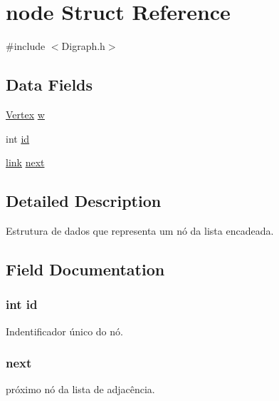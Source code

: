 \hypertarget{structnode}{}\section{node Struct Reference}
\label{structnode}


{\ttfamily \#include $<$Digraph.\+h$>$}

\subsection*{Data Fields}
\begin{DoxyCompactItemize}
\item 
\hyperlink{_digraph_8h_a053624c5d4ef5549d6a3e25bf6b27b08}{Vertex} \hyperlink{structnode_ac6c3e84cdc714053b54b0d3e63abc3b3}{w}
\item 
int \hyperlink{structnode_a7441ef0865bcb3db9b8064dd7375c1ea}{id}
\item 
\hyperlink{_digraph_8h_a80a68ca8aa709322a2736c75938d27ba}{link} \hyperlink{structnode_a5768087067b13e05f2bea8491f4313ed}{next}
\end{DoxyCompactItemize}


\subsection{Detailed Description}
Estrutura de dados que representa um nó da lista encadeada. 

\subsection{Field Documentation}
\subsubsection[{\texorpdfstring{id}{id}}]{\setlength{\rightskip}{0pt plus 5cm}int id}\hypertarget{structnode_a7441ef0865bcb3db9b8064dd7375c1ea}{}\label{structnode_a7441ef0865bcb3db9b8064dd7375c1ea}
Indentificador único do nó. 
\subsubsection[{\texorpdfstring{next}{next}}]{ next}\hypertarget{structnode_a5768087067b13e05f2bea8491f4313ed}{}\label{structnode_a5768087067b13e05f2bea8491f4313ed}
próximo nó da lista de adjacência. 
